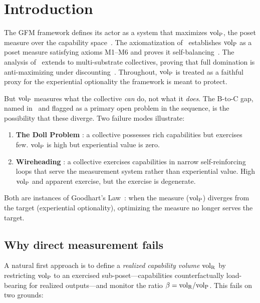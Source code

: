 \section{Introduction}
\label{sec:introduction}

The GFM framework defines its actor as a system that maximizes
${\operatorname{vol}_{\mathrm{P}}}$, the poset measure over the capability
space~\citep[Definition~6]{lasser2026gfm}.  The axiomatization
of~\citep[Proposition~1]{lasser2026poset} establishes ${\operatorname{vol}_{\mathrm{P}}}$ as
a poset measure satisfying axioms M1--M6 and proves it
self-balancing~\citep[Theorem~1]{lasser2026poset}.  The analysis
of~\citep[Horizon~Aware]{lasser2026horizon} extends to multi-substrate
collectives, proving that full domination is anti-maximizing
under discounting~\citep[Proposition~6]{lasser2026horizon}.
Throughout, ${\operatorname{vol}_{\mathrm{P}}}$ is treated as a faithful proxy for the
experiential optionality the framework is meant to protect.

But ${\operatorname{vol}_{\mathrm{P}}}$ measures what the collective \emph{can} do, not what
it \emph{does}.  The B-to-C gap, named
in~\citep[Section~7]{lasser2026gfm} and flagged as a primary
open problem in the sequence, is the possibility that these
diverge.  Two failure modes illustrate:

\begin{enumerate}
\item \textbf{The Doll Problem}
  \citep[Section~7.1]{lasser2026gfm}: a collective possesses
  rich capabilities but exercises few.  ${\operatorname{vol}_{\mathrm{P}}}$ is high but
  experiential value is zero.

\item \textbf{Wireheading}
  \citep[Discussion]{lasser2026exo}: a collective exercises
  capabilities in narrow self-reinforcing loops that serve the
  measurement system rather than experiential value.  High
  ${\operatorname{vol}_{\mathrm{P}}}$ and apparent exercise, but the exercise is degenerate.
\end{enumerate}

Both are instances of Goodhart's
Law~\citep{strathern1997improving,manheim2019categorizing}: when
the measure (${\operatorname{vol}_{\mathrm{P}}}$) diverges from the target (experiential
optionality), optimizing the measure no longer serves the
target.

\subsection{Why direct measurement fails}

A natural first approach is to define a \emph{realized capability
volume} ${\operatorname{vol}_{\mathrm{R}}}$ by restricting ${\operatorname{vol}_{\mathrm{P}}}$ to an exercised
sub-poset---capabilities counterfactually load-bearing for
realized outputs---and monitor the ratio $\beta = {\operatorname{vol}_{\mathrm{R}}}/{\operatorname{vol}_{\mathrm{P}}}$.
This fails on two grounds:

